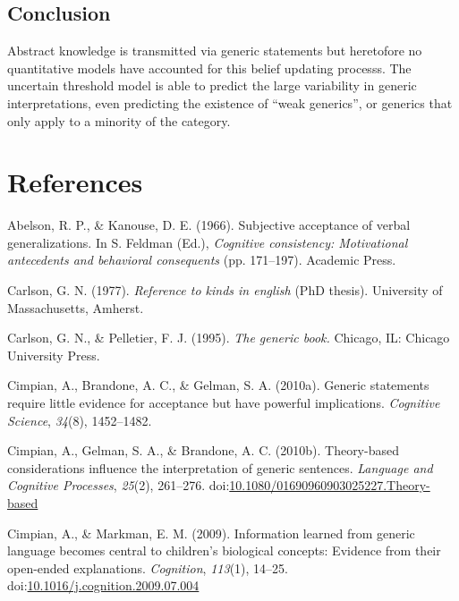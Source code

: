 \documentclass[,man,floatsintext]{apa6}
\theoremstyle{definition}
\theoremstyle{definition}
\theoremstyle{definition}
\theoremstyle{remark}
\begin{document}
\hypertarget{conclusion}{%
\subsection{Conclusion}\label{conclusion}}

Abstract knowledge is transmitted via generic statements but heretofore
no quantitative models have accounted for this belief updating processs.
The uncertain threshold model is able to predict the large variability
in generic interpretations, even predicting the existence of
\enquote{weak generics}, or generics that only apply to a minority of
the category.

\newpage

\hypertarget{references}{%
\section{References}\label{references}}

\hypertarget{refs}{}
\leavevmode\hypertarget{ref-Abelson1966}{}%
Abelson, R. P., \& Kanouse, D. E. (1966). Subjective acceptance of
verbal generalizations. In S. Feldman (Ed.), \emph{Cognitive
consistency: Motivational antecedents and behavioral consequents} (pp.
171--197). Academic Press.

\leavevmode\hypertarget{ref-Carlson1977}{}%
Carlson, G. N. (1977). \emph{Reference to kinds in english}
(PhD thesis). University of Massachusetts, Amherst.

\leavevmode\hypertarget{ref-Carlson1995}{}%
Carlson, G. N., \& Pelletier, F. J. (1995). \emph{The generic book.}
Chicago, IL: Chicago University Press.

\leavevmode\hypertarget{ref-Cimpian2010}{}%
Cimpian, A., Brandone, A. C., \& Gelman, S. A. (2010a). Generic
statements require little evidence for acceptance but have powerful
implications. \emph{Cognitive Science}, \emph{34}(8), 1452--1482.

\leavevmode\hypertarget{ref-Cimpian2010theory}{}%
Cimpian, A., Gelman, S. A., \& Brandone, A. C. (2010b). Theory-based
considerations influence the interpretation of generic sentences.
\emph{Language and Cognitive Processes}, \emph{25}(2), 261--276.
doi:\href{https://doi.org/10.1080/01690960903025227.Theory-based}{10.1080/01690960903025227.Theory-based}

\leavevmode\hypertarget{ref-Cimpian2009:explanations}{}%
Cimpian, A., \& Markman, E. M. (2009). Information learned from generic
language becomes central to children's biological concepts: Evidence
from their open-ended explanations. \emph{Cognition}, \emph{113}(1),
14--25.
doi:\href{https://doi.org/10.1016/j.cognition.2009.07.004}{10.1016/j.cognition.2009.07.004}
\end{document}
